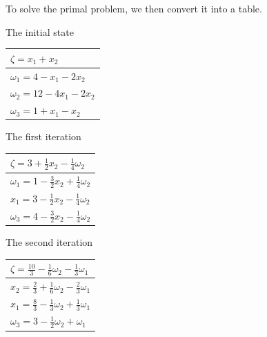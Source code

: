 \documentclass[a4paper,10pt]{article}
\begin{document}
\begin{enumerate}
\begin{enumerate}
{\begin{enumerate}
                To solve the primal problem, we then convert it into a table. 
    
                The initial state
                \begin{center}
                    \begin{tabular}{ l } 
                        $ \zeta = x_1 + x_2 $ \\
                        \hline
                        $ \omega_1 = 4 - x_1 - 2x_2 $ \\
                        $ \omega_2 = 12 - 4x_1 - 2x_2 $ \\
                        $ \omega_3 = 1 + x_1 - x_2 $
                    \end{tabular}
                \end{center}
                
                The first iteration
                \begin{center}
                    \begin{tabular}{ l } 
                        $\zeta = 3 + \frac{1}{2}x_2 - \frac{1}{4}\omega_2$ \\
                        \hline
                        $\omega_1 = 1 - \frac{3}{2}x_2 + \frac{1}{4}\omega_2$ \\
                        $x_1 = 3 - \frac{1}{2}x_2 - \frac{1}{4}\omega_2$ \\
                        $\omega_3 = 4 - \frac{3}{2}x_2 - \frac{1}{4}\omega_2$ \\
                    \end{tabular}
                \end{center}
    
                The second iteration
                \begin{center}
                    \begin{tabular}{ l } 
                        $\zeta = \frac{10}{3} - \frac{1}{6}\omega_2 - \frac{1}{3}\omega_1$ \\
                        \hline
                        $x_2 = \frac{2}{3} + \frac{1}{6}\omega_2 - \frac{2}{3}\omega_1$ \\
                        $x_1 = \frac{8}{3} - \frac{1}{3}\omega_2 + \frac{1}{3}\omega_1$ \\
                        $\omega_3 = 3 - \frac{1}{2}\omega_2 + \omega_1$ \\
                    \end{tabular}
                \end{center}


\end{enumerate}}
\end{enumerate}
\end{enumerate}
\end{document}
